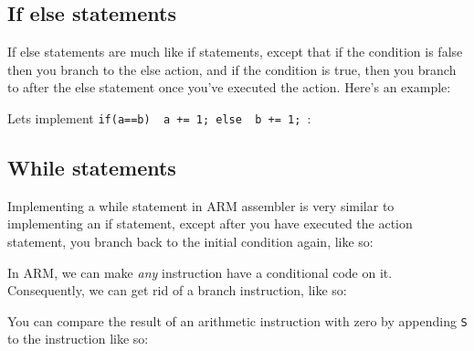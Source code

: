 \documentclass{article}
\begin{document}
\subsection{If else statements}

If else statements are much like if statements, except that if the condition is
false then you branch to the else action, and if the condition is true, then you
branch to after the else statement once you've executed the action. Here's an
example:

Lets implement {\tt if(a==b) { a += 1;} else { b += 1; }}:


\subsection{While statements}

Implementing a while statement in ARM assembler is very similar to implementing
an if statement, except after you have executed the action statement, you branch
back to the initial condition again, like so:


In ARM, we can make {\it any} instruction have a conditional code on it.
Consequently, we can get rid of a branch instruction, like so:


You can compare the result of an arithmetic instruction with zero by appending
{\tt S} to the instruction like so:

\end{document}
